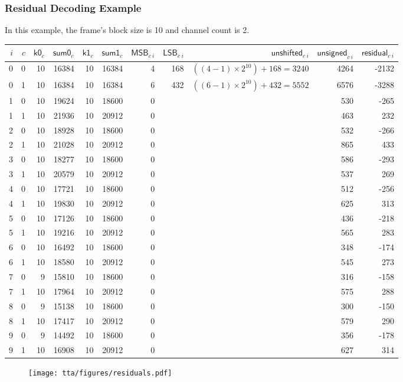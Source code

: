 \clearpage

\subsubsection{Residual Decoding Example}
In this example, the frame's \textsf{block size} is 10 and
channel count is 2.
\begin{table}[h]
  {
    \begin{tabular}{rrrrrrrrrrr}
      $i$ & $c$ & $\textsf{k0}_c$ & $\textsf{sum0}_c$ & $\textsf{k1}_c$ & $\textsf{sum1}_c$ & $\textsf{MSB}_{c~i}$ & $\textsf{LSB}_{c~i}$ & $\textsf{unshifted}_{c~i}$ & $\textsf{unsigned}_{c~i}$ & $\textsf{residual}_{c~i}$ \\
      \hline
0 & 0 & 10 & 16384 & 10 & 16384 & 4 &
168 & $((4 - 1) \times 2 ^ {10}) + 168 = 3240$ & 4264 &
-2132
\\
0 & 1 & 10 & 16384 & 10 & 16384 & 6 &
432 & $((6 - 1) \times 2 ^ {10}) + 432 = 5552$ & 6576 &
-3288
\\
1 & 0 & 10 & 19624 & 10 & 18600 & 0 &
 & & 530 &
-265
\\
1 & 1 & 10 & 21936 & 10 & 20912 & 0 &
 & & 463 &
232
\\
2 & 0 & 10 & 18928 & 10 & 18600 & 0 &
 & & 532 &
-266
\\
2 & 1 & 10 & 21028 & 10 & 20912 & 0 &
 & & 865 &
433
\\
3 & 0 & 10 & 18277 & 10 & 18600 & 0 &
 & & 586 &
-293
\\
3 & 1 & 10 & 20579 & 10 & 20912 & 0 &
 & & 537 &
269
\\
4 & 0 & 10 & 17721 & 10 & 18600 & 0 &
 & & 512 &
-256
\\
4 & 1 & 10 & 19830 & 10 & 20912 & 0 &
 & & 625 &
313
\\
5 & 0 & 10 & 17126 & 10 & 18600 & 0 &
 & & 436 &
-218
\\
5 & 1 & 10 & 19216 & 10 & 20912 & 0 &
 & & 565 &
283
\\
6 & 0 & 10 & 16492 & 10 & 18600 & 0 &
 & & 348 &
-174
\\
6 & 1 & 10 & 18580 & 10 & 20912 & 0 &
 & & 545 &
273
\\
7 & 0 & 9 & 15810 & 10 & 18600 & 0 &
 & & 316 &
-158
\\
7 & 1 & 10 & 17964 & 10 & 20912 & 0 &
 & & 575 &
288
\\
8 & 0 & 9 & 15138 & 10 & 18600 & 0 &
 & & 300 &
-150
\\
8 & 1 & 10 & 17417 & 10 & 20912 & 0 &
 & & 579 &
290
\\
9 & 0 & 9 & 14492 & 10 & 18600 & 0 &
 & & 356 &
-178
\\
9 & 1 & 10 & 16908 & 10 & 20912 & 0 &
 & & 627 &
314
\\
    \end{tabular}
  }
\end{table}
\begin{figure}[h]
  \texttt{[image: tta/figures/residuals.pdf]}
\end{figure}

